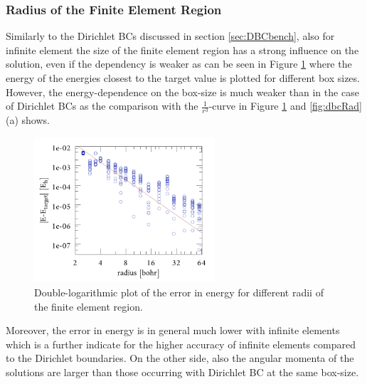 \subsubsection{Radius of the Finite Element Region}
\label{ch:bmSize}
Similarly to the Dirichlet BCs discussed in section \ref{sec:DBCbench}, also for infinite element the size of the finite element region has a strong influence on the solution, even if the dependency is weaker as can be seen in Figure \ref{fig:InfBoxs} where the energy of the energies closest to the target value is plotted for different box sizes.
However, the energy-dependence on the box-size is much weaker than in the case of Dirichlet BCs as the comparison with the $\frac{1}{r^3}$-curve in Figure \ref{fig:InfBoxs} and \ref{fig:dbcRad} (a) shows.
\begin{figure}
\includegraphics[width=0.6\textwidth]{Figures/BC/BoxsInfEL}
\caption{Double-logarithmic plot of the error in energy for different radii of the finite element region.}
\label{fig:InfBoxs}
\end{figure}
Moreover, the error in energy is in general much lower with infinite elements which is a further indicate for the higher accuracy of infinite elements compared to the Dirichlet boundaries.
On the other side, also the angular momenta of the solutions are larger than those occurring with Dirichlet BC at the same box-size.
